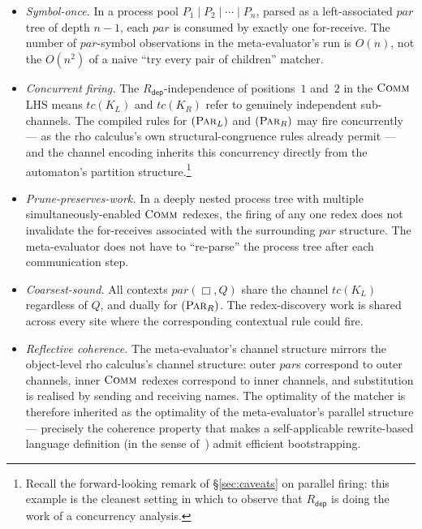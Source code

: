 \documentclass[11pt]{article}
\theoremstyle{plain}
\theoremstyle{definition}
\theoremstyle{remark}
\newcommand{\rdep}{R_{\mathsf{dep}}}
\begin{document}
\begin{itemize}[leftmargin=*]
  \item \emph{Symbol-once.} In a process pool $P_{1} \mid P_{2} \mid
        \cdots \mid P_{n}$, parsed as a left-associated $\mathit{par}$
        tree of depth $n-1$, each $\mathit{par}$ is consumed by exactly
        one for-receive. The number of $\mathit{par}$-symbol
        observations in the meta-evaluator's run is $O(n)$, not the
        $O(n^{2})$ of a naive ``try every pair of children'' matcher.
  \item \emph{Concurrent firing.} The $\rdep$-independence of
        positions~$1$ and~$2$ in the $\textsc{Comm}$ LHS means
        $tc(K_{L})$ and $tc(K_{R})$ refer to genuinely independent
        sub-channels. The compiled rules for $(\textsc{Par}_{L})$ and
        $(\textsc{Par}_{R})$ may fire concurrently --- as the rho
        calculus's own structural-congruence rules already permit ---
        and the channel encoding inherits this concurrency directly
        from the automaton's partition structure.\footnote{Recall the
        forward-looking remark of \S\ref{sec:caveats} on parallel
        firing: this example is the cleanest setting in which to
        observe that $\rdep$ is doing the work of a concurrency
        analysis.}
  \item \emph{Prune-preserves-work.} In a deeply nested process tree
        with multiple simultaneously-enabled $\textsc{Comm}$ redexes,
        the firing of any one redex does not invalidate the for-receives
        associated with the surrounding $\mathit{par}$ structure. The
        meta-evaluator does not have to ``re-parse'' the process tree
        after each communication step.
  \item \emph{Coarsest-sound.} All contexts $\mathit{par}(\Box, Q)$
        share the channel $tc(K_{L})$ regardless of $Q$, and dually for
        $(\textsc{Par}_{R})$. The redex-discovery work is shared across
        every site where the corresponding contextual rule could fire.
  \item \emph{Reflective coherence.} The meta-evaluator's channel
        structure mirrors the object-level rho calculus's channel
        structure: outer $\mathit{par}$s correspond to outer channels,
        inner $\textsc{Comm}$ redexes correspond to inner channels, and
        substitution is realised by sending and receiving names. The
        optimality of the matcher is therefore inherited as the
        optimality of the meta-evaluator's parallel structure ---
        precisely the coherence property that makes a self-applicable
        rewrite-based language definition (in the sense
        of~\cite{F1R3FLY-mettail}) admit efficient bootstrapping.
\end{itemize}
\end{document}
